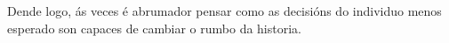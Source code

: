 \begin{refsection}
\begin{multicols}{2}
Dende logo, ás veces é abrumador pensar como as decisións do individuo menos
esperado son capaces de cambiar o rumbo da historia.

\nocite{gottstein.k_2016}
\nocite{dawidoff.n_2011}

\printbibliography

\end{multicols}
\end{refsection}
